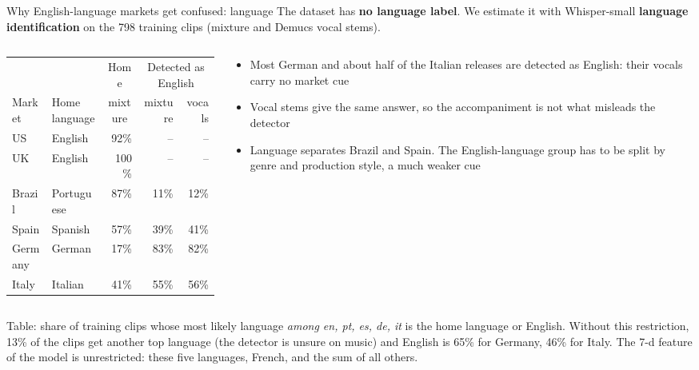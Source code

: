 \documentclass[aspectratio=169,11pt]{beamer}
\newenvironment{tight}{\begin{itemize}\setlength{\itemsep}{1.5pt}\setlength{\parskip}{0pt}\setlength{\topsep}{0pt}}{\end{itemize}}
\begin{document}
\begin{frame}[t]{Why English-language markets get confused: language}
  \small
  The dataset has \textbf{no language label}. We estimate it with Whisper-small \textbf{language identification}
  on the 798 training clips (mixture and Demucs vocal stems).
  \vspace{0.5em}

  \begin{columns}[T]
    \begin{column}{0.55\textwidth}
      {\footnotesize\setlength{\tabcolsep}{4.5pt}
      \begin{tabular}{@{}llrrr@{}}
        \toprule
        & & \multicolumn{1}{c}{Home} & \multicolumn{2}{c}{Detected as English} \\ \cmidrule(l){4-5}
        Market & Home language & \multicolumn{1}{c}{mixture} & mixture & vocals \\ \midrule
        US      & English    & 92\%  & --   & -- \\
        UK      & English    & 100\% & --   & -- \\
        Brazil  & Portuguese & 87\%  & 11\% & 12\% \\
        Spain   & Spanish    & 57\%  & 39\% & 41\% \\
        Germany & German     & 17\%  & \alert{83\%} & \alert{82\%} \\
        Italy   & Italian    & 41\%  & \alert{55\%} & \alert{56\%} \\
        \bottomrule
      \end{tabular}}

    \end{column}
    \begin{column}{0.45\textwidth}
      \begin{tight}\footnotesize
        \item Most German and about half of the Italian releases are \alert{detected as English}: their vocals carry no market cue
        \item Vocal stems give the same answer, so the accompaniment is not what misleads the detector
        \item Language separates Brazil and Spain. The English-language group has to be split by genre and production style, a much weaker cue
      \end{tight}
    \end{column}
  \end{columns}
  \vspace{0.2em}
  {\scriptsize\color{gray}Table: share of training clips whose most likely language \emph{among en, pt, es, de, it} is the home language or English. Without this restriction, 13\% of the clips get another top language (the detector is unsure on music) and English is 65\% for Germany, 46\% for Italy. The 7-d feature of the model is unrestricted: these five languages, French, and the sum of all others.\par}
\end{frame}
\end{document}
